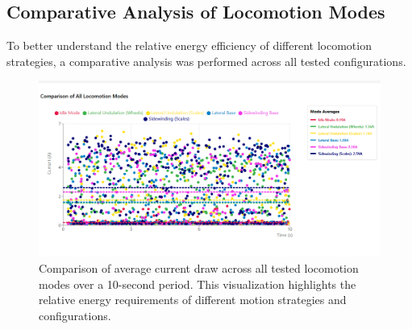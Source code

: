 \documentclass[12pt,a4paper]{report}
\begin{document}
\subsection{Comparative Analysis of Locomotion Modes}
To better understand the relative energy efficiency of different locomotion strategies, a comparative analysis was performed across all tested configurations.

\begin{figure}[H]
    \centering
    \includegraphics[width=12cm]{media/combined_current_comparison.png}
    \caption{Comparison of average current draw across all tested locomotion modes over a 10-second period. This visualization highlights the relative energy requirements of different motion strategies and configurations.}
    \label{fig:combined_current}
\end{figure}

\begin{table}[H]
    \centering
    \caption{Comprehensive current consumption statistics across all locomotion modes.}
    \label{tab:current_measurements_complete}
\end{table}
\end{document}
